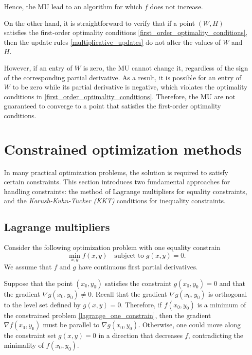 \documentclass{amsart}
\begin{document}
\noindent Hence, the MU lead to an algorithm for which $f$ does not increase.

\bigskip

On the other hand, it is straightforward to verify that if a point $(W,H)$ satisfies the first-order optimality conditions \eqref{first_order_optimality_conditions}, then the update rules \eqref{multiplicative_updates} do not alter the values of $W$ and $H$. 

However, if an entry of $W$ is zero, the MU cannot change it, regardless of the sign of the corresponding partial derivative. As a result, it is possible for an entry of $W$ to be zero while its partial derivative is negative, which violates the optimality conditions in \eqref{first_order_optimality_conditions}. Therefore, the MU are not guaranteed to converge to a point that satisfies the first-order optimality conditions.




\appendix

\section{Constrained optimization methods}\label{constrained_optimization_methods}

In many practical optimization problems, the solution is required to satisfy certain constraints. This section introduces two fundamental approaches for handling constraints: the method of Lagrange multipliers for equality constraints, and the {\it Karush-Kuhn-Tucker (KKT)} conditions for inequality constraints.

\subsection{Lagrange multipliers}

Consider the following optimization problem with one equality constrain
\begin{equation}
    \label{lagrange_one_constrain}
    \min_{x,y} f(x,y) \quad \text{subject to } g(x,y)= 0.
\end{equation}
We assume that $f$ and $g$ have continuous first partial derivatives.

\bigskip

Suppose that the point $(x_0,y_0)$ satisfies  the constraint $g(x_0,y_0)=0$ and that the gradient $\nabla g(x_0,y_0)\neq 0$. Recall that the gradient $\nabla g(x_0,y_0)$ is orthogonal to the level set defined by $g(x,y)=0$. Therefore, if $f(x_0,y_0)$ is a minimum of the constrained problem \eqref{lagrange_one_constrain}, then the gradient $\nabla f(x_0,y_0)$ must be parallel to $\nabla g(x_0,y_0)$. Otherwise, one could move along the constraint set $g(x,y)=0$ in a direction that decreases $f$, contradicting the minimality of $f(x_0,y_0)$.
\end{document}
